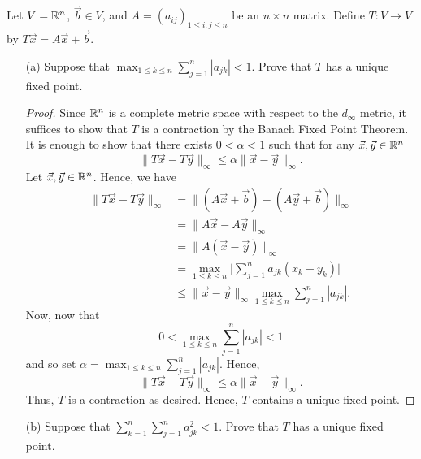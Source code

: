 \documentclass[a4paper]{article}
\begin{document}
\begin{problem}
    Let \( V = \mathbb{R}^{n} \), \( \vec{ b }  \in V  \), and \( A = ({a}_{ij})_{1 \leq i,j \leq n } \) be an \( n \times n  \) matrix. Define \( T : V \to V  \) by \( T \vec{ x }  = A \vec{ x }  + \vec{ b }  \).
\end{problem}
\begin{enumerate}
    \item[(a)] Suppose that \( \max_{1 \leq k \leq n } \sum_{ j=1  }^{ n } | {a}_{jk} | < 1  \). Prove that \( T  \) has a unique fixed point.
        \begin{proof}
        Since \( \mathbb{R}^{n} \) is a complete metric space with respect to the \( {d}_{\infty } \) metric, it suffices to show that \( T  \) is a contraction by the Banach Fixed Point Theorem. It is enough to show that there exists \( 0 < \alpha < 1  \) such that for any \( \vec{ x } , \vec{ y }  \in \mathbb{R}^{n} \)
        \[  \|T \vec{ x }  - T \vec{ y } \|_{\infty } \leq \alpha \|\vec{ x } - \vec{ y } \|_{\infty }. \] 
        Let \( \vec{ x } , \vec{ y }  \in \mathbb{R}^{n} \). Hence, we have
        \begin{align*}
            \|T \vec{ x }  - T \vec{ y } \|_{\infty } &= \|(A \vec{ x }  + \vec{ b } ) - (A \vec{ y }  + \vec{ b } ) \|_{\infty }  \\
                                                      &= \|A \vec{ x } - A \vec{ y } \|_{\infty } \\
                                                      &= \|A (\vec{ x }  - \vec{ y } )\|_{\infty } \\
                                                      &=  \max_{1 \leq k \leq n } \Big| \sum_{ j=1  }^{ n } {a}_{jk} ({x}_{k} -{y}_{k}) \Big|  \\
                                                      &\leq \|\vec{ x }  - \vec{ y } \|_{\infty } \max_{1 \leq k \leq n } \sum_{ j=1  }^{ n } | {a}_{jk} |.
        \end{align*}
        Now, now that 
        \[  0 < \max_{1 \leq k \leq n  } \sum_{ j=1  }^{ n } | {a}_{jk} |  < 1  \]
        and so set \( \alpha = \max_{1 \leq k \leq n } \sum_{ j=1  }^{ n } | {a}_{jk} |  \). Hence, 
        \[  \|T \vec{ x }  - T \vec{ y } \|_{\infty } \leq \alpha \|\vec{ x }  - \vec{ y } \|_{\infty }. \] 
        Thus, \( T  \) is a contraction as desired. Hence, \( T  \) contains a unique fixed point.
        \end{proof} 
    \item[(b)] Suppose that \( \sum_{ k=1  }^{ n } \sum_{ j=1  }^{ n } {a}_{jk }^{2} < 1  \). Prove that \( T  \) has a unique fixed point.

\end{enumerate}
\end{document}
